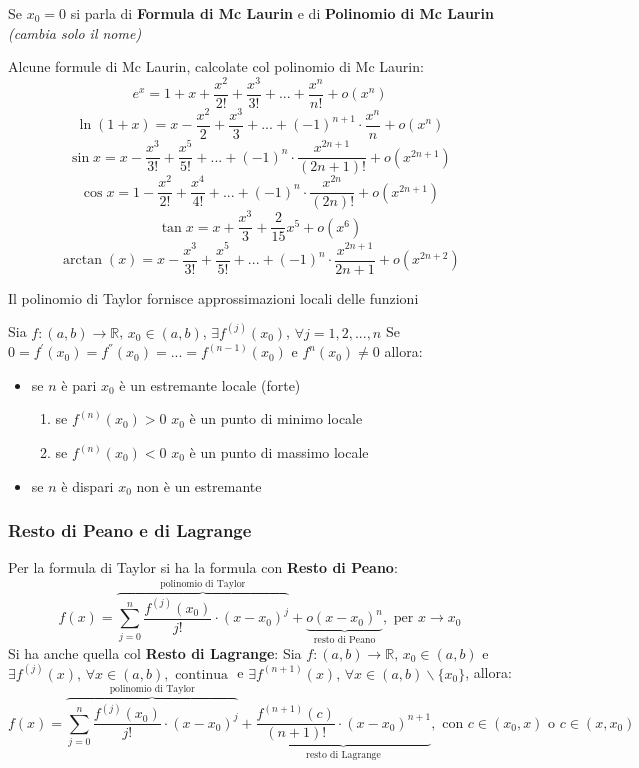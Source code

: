 \documentclass[a4paper,12pt, oneside]{book}
\begin{document}
\begin{teorema}
Se $x_0=0$ si parla di \textbf{Formula di Mc Laurin} e di \textbf{Polinomio di Mc Laurin} \textit{(cambia solo il nome)}
\end{teorema}
\newpage
\begin{shaded}
Alcune formule di Mc Laurin, calcolate col polinomio di Mc Laurin:
$$e^{x}=1+x+\frac{x^2}{2!}+\frac{x^3}{3!}+...+\frac{x^n}{n!}+o(x^n)$$
$$\ln(1+x)=x-\frac{x^2}{2}+\frac{x^3}{3}+...+(-1)^{n+1}\cdot\frac{x^n}{n}+o(x^n)$$
$$\sin x=x-\frac{x^3}{3!}+\frac{x^5}{5!}+...+(-1)^{n}\cdot\frac{x^{2n+1}}{(2n+1)!}+o(x^{2n+1})$$
$$\cos x=1-\frac{x^2}{2!}+\frac{x^4}{4!}+...+(-1)^{n}\cdot\frac{x^{2n}}{(2n)!}+o(x^{2n+1})$$
$$\tan x=x+\frac{x^3}{3}+\frac{2}{15}x^5+o(x^6)$$
$$\arctan(x)=x-\frac{x^3}{3!}+\frac{x^5}{5!}+...+(-1)^{n}\cdot\frac{x^{2n+1}}{2n+1}+o(x^{2n+2})$$
\end{shaded}
\begin{nota}
Il polinomio di Taylor fornisce approssimazioni locali delle funzioni 
\end{nota}
\begin{teorema}
Sia $f:(a,b)\rightarrow\mathbb{R}$, $x_0\in (a,b)$, $\exists f^{(j)}(x_0)$, $ \forall j=1,2,...,n$
Se $0=f^{'}(x_0)=f^{''}(x_0)=...=f^{(n-1)}(x_0)$ e $f^{n}(x_0)\neq 0$ allora:
\begin{itemize}
\item se $n$ è pari $x_0$ è un estremante locale (forte)
\begin{enumerate}
\item se $f^{(n)}(x_0)>0$ $x_0$ è un punto di minimo locale
\item se $f^{(n)}(x_0)<0$ $x_0$ è un punto di massimo locale
\end{enumerate}
\item se $n$ è dispari $x_0$ non è un estremante
\end{itemize}
\end{teorema}
\subsubsection{Resto di Peano e di Lagrange}
Per la formula di Taylor si ha la formula con \textbf{Resto di Peano}:
$$f(x)=\overbrace{\sum_{j=0}^{n} \frac{f^{(j)}(x_0)}{j!}\cdot {(x-x_0)}^j}^{\mbox{polinomio di Taylor}}+\underbrace{o(x-x_0)^n}_{\mbox{resto di Peano}}, \mbox{ per } x\rightarrow x_0$$
Si ha anche quella col \textbf{Resto di Lagrange}:
Sia $f:(a,b)\rightarrow \mathbb{R},\, x_0\in (a,b)$  e $\exists f^{(j)}(x),\, \forall x\in (a,b), \mbox{ continua }$ e $\exists f^{(n+1)}(x),\, \forall x\in(a,b)\backslash \{x_0\}$, allora:
$$f(x)=\overbrace{\sum_{j=0}^{n} \frac{f^{(j)}(x_0)}{j!}\cdot {(x-x_0)}^j}^{\mbox{polinomio di Taylor}}+\underbrace{\frac{f^{(n+1)}(c)}{(n+1)!}\cdot(x-x_0)^{n+1}}_{\mbox{resto di Lagrange}},\mbox{ con } c\in(x_0,x) \mbox{ o } c\in (x,x_0)$$
\end{document}
